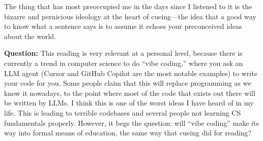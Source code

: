 The thing that has most preoccupied me in the days since I listened to it is the bizarre and pernicious ideology at the heart of cueing—the idea that a good way to know what a sentence says is to assume it echoes your preconceived ideas about the world.

\textbf{Question:}
This reading is very relevant at a personal level, because there is currently a trend in computer science to do ``vibe coding,'' where you ask an LLM agent (Cursor and GitHub Copilot are the most notable examples) to write your code for you.
Some people claim that this will replace programming as we know it nowadays, to the point where most of the code that exists out there will be written by LLMs.
I think this is one of the worst ideas I have heard of in my life.
This is leading to terrible codebases and several people not learning CS fundamentals properly.
However, it begs the question: will ``vibe coding'' make its way into formal means of education, the same way that cueing did for reading?